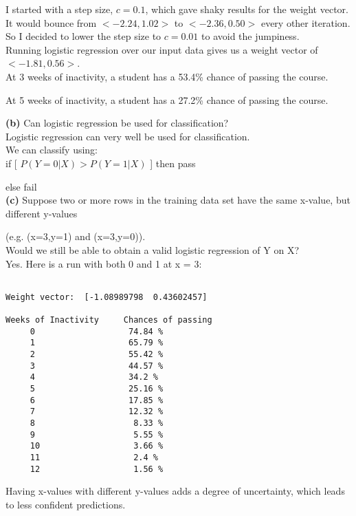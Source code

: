 \documentclass{article}
\begin{document}
I started with a step size, $c = 0.1$, which gave shaky results for the weight vector. It would bounce from $ < -2.24, 1.02 >$ to $ < -2.36, 0.50 >$ every other iteration. \\
So I decided to lower the step size to $c = 0.01$ to avoid the jumpiness. \\

Running logistic regression over our input data gives us a weight vector of $ < -1.81,  0.56 > $. \\

At 3 weeks of inactivity, a student has a 53.4\% chance of passing the course.

At 5 weeks of inactivity, a student has a 27.2\% chance of passing the course. \\

\newpage

\hspace{-2.5em} \textbf{(b)} Can logistic regression be used for classification? \\

Logistic regression can very well be used for classification. \\

We can classify using: \\

if [ $P( Y=0 | X) > P( Y=1 | X)$ ] then pass

\hspace{1em} else fail \\

\hspace{-2.5em} \textbf{(c)} Suppose two or more rows in the training data set have the same x-value, but different y-values

\hspace{1em} (e.g. (x=3,y=1) and (x=3,y=0)). \\

Would we still be able to obtain a valid logistic regression of Y on X? \\

Yes. Here is a run with both 0 and 1 at x = 3:

\begin{lstlisting}[breaklines=true,basicstyle=\small]

Weight vector:  [-1.08989798  0.43602457]

Weeks of Inactivity		Chances of passing
	 0 					 74.84 %
	 1 					 65.79 %
	 2 					 55.42 %
	 3 					 44.57 %
	 4 					 34.2 %
	 5 		 			 25.16 %
	 6 		 			 17.85 %
	 7 		 			 12.32 %
	 8 		 			  8.33 %
	 9 					  5.55 %
	 10 				  3.66 %
	 11 				  2.4 %
	 12 				  1.56 %
\end{lstlisting}

Having x-values with different y-values adds a degree of uncertainty, which leads to less confident predictions. 



\end{document}
